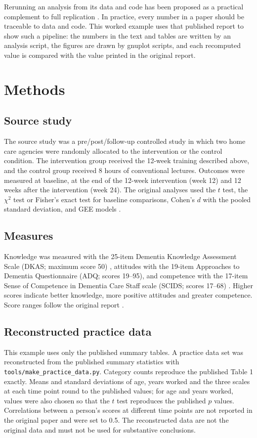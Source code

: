 \documentclass[pdflatex,sn-vancouver-num,referee,lineno]{sn-jnl}
\begin{document}
Rerunning an analysis from its data and code has been proposed as a practical complement to full replication \cite{Peng2011}. In practice, every number in a paper should be traceable to data and code. This worked example uses that published report \cite{Su2021} to show such a pipeline: the numbers in the text and tables are written by an analysis script, the figures are drawn by gnuplot scripts, and each recomputed value is compared with the value printed in the original report.

\section{Methods}
\subsection{Source study}
The source study was a pre/post/follow-up controlled study in which two home care agencies were randomly allocated to the intervention or the control condition. The intervention group received the 12-week training described above, and the control group received 8 hours of conventional lectures. Outcomes were measured at baseline, at the end of the 12-week intervention (week 12) and 12 weeks after the intervention (week 24). The original analyses used the $t$ test, the $\chi^2$ test or Fisher's exact test for baseline comparisons, Cohen's $d$ with the pooled standard deviation, and GEE models \cite{Su2021}.

\subsection{Measures}
Knowledge was measured with the 25-item Dementia Knowledge Assessment Scale (DKAS; maximum score 50) \cite{Annear2017}, attitudes with the 19-item Approaches to Dementia Questionnaire (ADQ; scores 19--95), and competence with the 17-item Sense of Competence in Dementia Care Staff scale (SCIDS; scores 17--68) \cite{Schepers2012}. Higher scores indicate better knowledge, more positive attitudes and greater competence. Score ranges follow the original report \cite{Su2021}.

\subsection{Reconstructed practice data}
This example uses only the published summary tables. A practice data set was reconstructed from the published summary statistics with \texttt{tools/make\_practice\_data.py}. Category counts reproduce the published Table 1 exactly. Means and standard deviations of age, years worked and the three scales at each time point round to the published values; for age and years worked, values were also chosen so that the $t$ test reproduces the published $p$ values. Correlations between a person's scores at different time points are not reported in the original paper and were set to 0.5. The reconstructed data are not the original data and must not be used for substantive conclusions.
\end{document}
